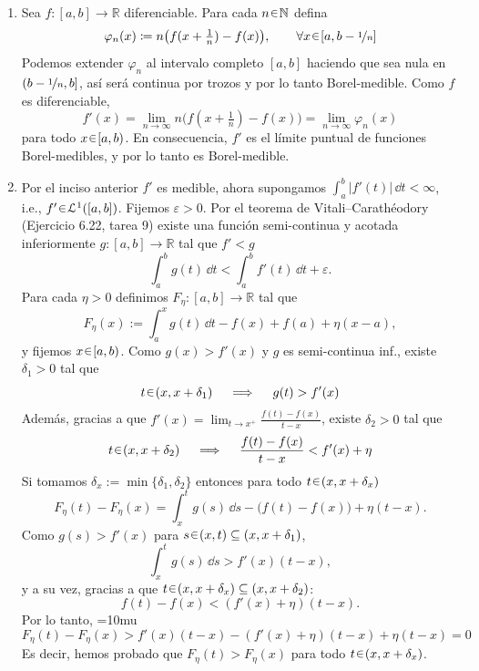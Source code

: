 \begin{sol}
\begin{enumerate}[label = (\roman*)]
\item Sea $f \colon [a,b]\to\mathbb{R}$ diferenciable. Para cada $n\en\mathbb{N}$ defina
\[
\varphi_n(x)
\coloneq
n\bigl(f(x+\tfrac1n)-f(x)\bigr),
\qquad\forall x\en[a,b-\nicefrac{1}{n}]
\]
Podemos extender $\varphi_n$ al intervalo completo $[a,b]$ haciendo que sea nula en $(b-\nicefrac{1}{n},b]$, así será continua por trozos y por lo tanto Borel-medible.
Como $f$ es diferenciable,
\[
f'(x)
=
\lim_{n\to\infty}
n\bigl(f(x+\tfrac1n)-f(x)\bigr)
= \lim_{n\to\infty} \varphi_n(x)
\]
para todo $x\en[a,b)$. En consecuencia, $f'$ es el límite puntual de funciones Borel-medibles, y por lo tanto es Borel-medible.

\item Por el inciso anterior $f'$ es medible, ahora supongamos $\int_a^b |f'(t)|\,\dd t < \infty$, i.e., $f'\en\mathcal{L}^1([a,b])$.
Fijemos $\varepsilon>0$. Por el teorema de Vitali--Carathéodory (Ejercicio 6.22, tarea 9) existe una función semi-continua y acotada inferiormente $g\colon [a,b]\to\mathbb{R}$ tal que $f' < g$
\[
\int_a^b g(t)\,\dd t
<
\int_a^b f'(t)\,\dd t+\varepsilon.
\]
Para cada $\eta>0$ definimos $F_\eta \colon [a,b] \to \mathbb{R}$ tal que
\[
F_\eta(x)
:=
\int_a^x g(t)\,\dd t
-
f(x)
+
f(a)
+
\eta(x-a),
\]
y fijemos $x\en[a,b)$. Como $g(x)>f'(x)$ y $g$ es semi-continua inf., existe $\delta_1>0$ tal que
\[
t\en(x,x+\delta_1)
\quad\implies\quad
g(t)>f'(x)
\]
Además, gracias a que $f'(x)=\lim_{t\to x^+}\frac{f(t)-f(x)}{t-x}$, existe $\delta_2>0$ tal que
\[
t\en(x,x+\delta_2)
\quad\implies\quad
\frac{f(t)-f(x)}{t-x}
<
f'(x)+\eta
\]
Si tomamos $\delta_x:=\min\{\delta_1,\delta_2\}$ entonces para todo $t \en (x,x+\delta_x)$
\[
F_\eta(t)-F_\eta(x)
=
\int_x^t g(s)\,\dd s
-
\bigl(f(t)-f(x)\bigr)
+
\eta(t-x).
\]
Como $g(s)>f'(x)$ para $s\en(x,t) \subseteq (x,x+\delta_1)$,
\[
    \int_x^t g(s)\,\dd s
    >
    f'(x)(t-x),
\]
y a su vez, gracias a que $t \en (x,x+\delta_x) \subseteq (x,x+\delta_2)$:
\[
    f(t)-f(x)
    <
    (f'(x)+\eta)(t-x).
\]
Por lo tanto,
{\thickmuskip=10mu
\[
F_\eta(t)-F_\eta(x)
>
f'(x)(t-x)
-
(f'(x)+\eta)(t-x)
+
\eta(t-x)
=0
\]
}%
Es decir, hemos probado que $F_\eta(t)>F_\eta(x)$ para todo $t\en(x,x+\delta_x)$.


\end{enumerate}
\end{sol}
